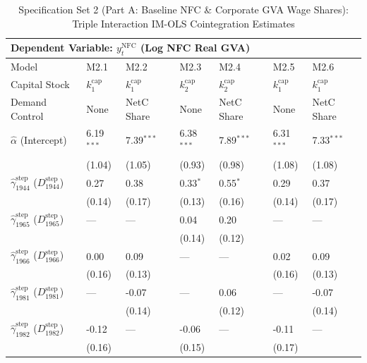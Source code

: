 \begin{table}[H]
\centering
\caption{Specification Set 2 (Part A: Baseline NFC \& Corporate GVA Wage Shares): Triple Interaction IM-OLS Cointegration Estimates}
\label{tab:spec_set_2_a}
\scriptsize
\begin{tabular}{p{3.8cm}p{1.35cm}p{1.35cm}p{1.35cm}p{1.35cm}p{1.35cm}p{1.35cm}}
\toprule
\multicolumn{7}{l}{\textbf{Dependent Variable: $y_t^{\text{NFC}}$ (Log NFC Real GVA)}} \\
\midrule
Model & M2.1 & M2.2 & M2.3 & M2.4 & M2.5 & M2.6  \\
Capital Stock & $k^{\text{cap}}_1$ & $k^{\text{cap}}_1$ & $k^{\text{cap}}_2$ & $k^{\text{cap}}_2$ & $k^{\text{cap}}_1$ & $k^{\text{cap}}_1$  \\
Demand Control & None & NetC Share & None & NetC Share & None & NetC Share  \\
\midrule
$\hat{\alpha}$ (Intercept)  & 6.19$^{***}$ & 7.39$^{***}$ & 6.38$^{***}$ & 7.89$^{***}$ & 6.31$^{***}$ & 7.33$^{***}$  \\
 & {\scriptsize (1.04)} & {\scriptsize (1.05)} & {\scriptsize (0.93)} & {\scriptsize (0.98)} & {\scriptsize (1.08)} & {\scriptsize (1.08)}  \\
$\hat{\gamma}^{\text{step}}_{1944}$ ($D^{\text{step}}_{1944}$)  & 0.27 & 0.38 & 0.33$^{*}$ & 0.55$^{*}$ & 0.29 & 0.37  \\
 & {\scriptsize (0.14)} & {\scriptsize (0.17)} & {\scriptsize (0.13)} & {\scriptsize (0.16)} & {\scriptsize (0.14)} & {\scriptsize (0.17)}  \\
$\hat{\gamma}^{\text{step}}_{1965}$ ($D^{\text{step}}_{1965}$)  & --- & --- & 0.04 & 0.20 & --- & ---  \\
 &  &  & {\scriptsize (0.14)} & {\scriptsize (0.12)} &  &   \\
$\hat{\gamma}^{\text{step}}_{1966}$ ($D^{\text{step}}_{1966}$)  & 0.00 & 0.09 & --- & --- & 0.02 & 0.09  \\
 & {\scriptsize (0.16)} & {\scriptsize (0.13)} &  &  & {\scriptsize (0.16)} & {\scriptsize (0.13)}  \\
$\hat{\gamma}^{\text{step}}_{1981}$ ($D^{\text{step}}_{1981}$)  & --- & -0.07 & --- & 0.06 & --- & -0.07  \\
 &  & {\scriptsize (0.14)} &  & {\scriptsize (0.12)} &  & {\scriptsize (0.14)}  \\
$\hat{\gamma}^{\text{step}}_{1982}$ ($D^{\text{step}}_{1982}$)  & -0.12 & --- & -0.06 & --- & -0.11 & ---  \\
 & {\scriptsize (0.16)} &  & {\scriptsize (0.15)} &  & {\scriptsize (0.17)} &   \\

\end{tabular}
\end{table}
